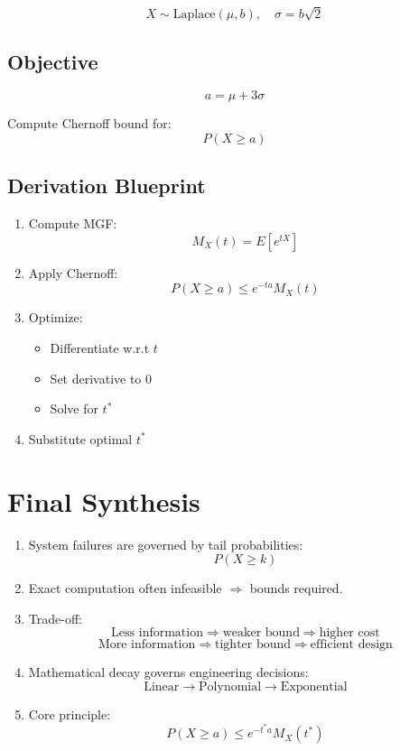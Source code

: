 \documentclass[11pt]{article}
\begin{document}
\[
X \sim \text{Laplace}(\mu, b), \quad \sigma = b\sqrt{2}
\]

\subsection{Objective}

\[
a = \mu + 3\sigma
\]

Compute Chernoff bound for:
\[
P(X \ge a)
\]

\subsection{Derivation Blueprint}

\begin{enumerate}[noitemsep]
\item Compute MGF:
\[
M_X(t) = E[e^{tX}]
\]
\item Apply Chernoff:
\[
P(X \ge a) \le e^{-ta} M_X(t)
\]
\item Optimize:
\begin{itemize}[noitemsep]
\item Differentiate w.r.t $t$
\item Set derivative to $0$
\item Solve for $t^*$
\end{itemize}
\item Substitute optimal $t^*$
\end{enumerate}

\section{Final Synthesis}

\begin{enumerate}[noitemsep]
\item System failures are governed by tail probabilities:
\[
P(X \ge k)
\]
\item Exact computation often infeasible $\Rightarrow$ bounds required.
\item Trade-off:
\[
\text{Less information} \Rightarrow \text{weaker bound} \Rightarrow \text{higher cost}
\]
\[
\text{More information} \Rightarrow \text{tighter bound} \Rightarrow \text{efficient design}
\]
\item Mathematical decay governs engineering decisions:
\[
\text{Linear} \rightarrow \text{Polynomial} \rightarrow \text{Exponential}
\]
\item Core principle:
\[
P(X \ge a) \le e^{-t^* a} M_X(t^*)
\]
\end{enumerate}
\end{document}
